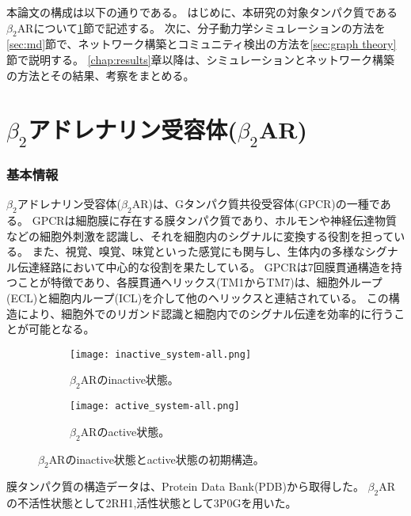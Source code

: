 本論文の構成は以下の通りである。
はじめに、本研究の対象タンパク質である$\beta_2$ARについて\ref{sec:b2ar}節で記述する。
次に、分子動力学シミュレーションの方法を\ref{sec:md}節で、ネットワーク構築とコミュニティ検出の方法を\ref{sec:graph theory}節で説明する。
\ref{chap:results}章以降は、シミュレーションとネットワーク構築の方法とその結果、考察をまとめる。

\newpage

\section{$\beta_2$アドレナリン受容体($\beta_2$AR)}
\label{sec:b2ar}

\subsubsection{基本情報}
$\beta_2$アドレナリン受容体($\beta_2$AR)は、Gタンパク質共役受容体(GPCR)の一種である。
GPCRは細胞膜に存在する膜タンパク質であり、ホルモンや神経伝達物質などの細胞外刺激を認識し、それを細胞内のシグナルに変換する役割を担っている。
また、視覚、嗅覚、味覚といった感覚にも関与し、生体内の多様なシグナル伝達経路において中心的な役割を果たしている。
GPCRは7回膜貫通構造を持つことが特徴であり、各膜貫通ヘリックス(TM1からTM7)は、細胞外ループ(ECL)と細胞内ループ(ICL)を介して他のヘリックスと連結されている。
この構造により、細胞外でのリガンド認識と細胞内でのシグナル伝達を効率的に行うことが可能となる。

\begin{figure}[htbp]
    \centering
    \begin{subfigure}{0.45\textwidth} %
      \centering
      \texttt{[image: inactive\_system-all.png]}
      \caption{$\beta_2$ARのinactive状態。}
      \label{fig:inactive_system}
    \end{subfigure}
    \hspace{0.05\textwidth} %
    \begin{subfigure}{0.45\textwidth}
      \centering
      \texttt{[image: active\_system-all.png]}
      \caption{$\beta_2$ARのactive状態。}
      \label{fig:active_system}
    \end{subfigure}
    \caption{$\beta_2$ARのinactive状態とactive状態の初期構造。}
    \label{fig:system-all}
  \end{figure}

膜タンパク質の構造データは、Protein Data Bank(PDB)から取得した。
$\beta_2$ARの不活性状態として2RH1\cite{cherezov2007},活性状態として3P0G\cite{rasmussen2011}を用いた。

